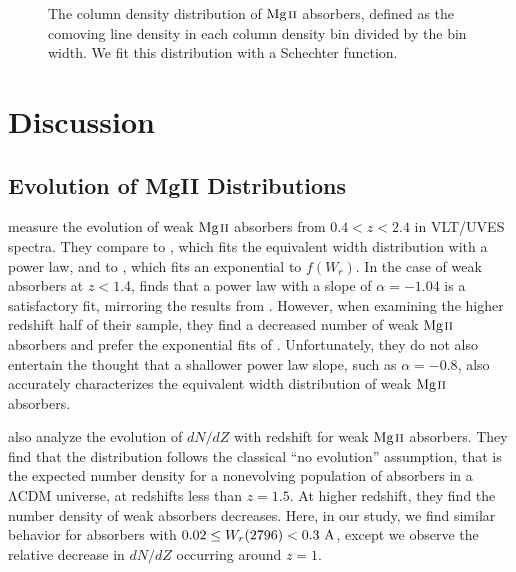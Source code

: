 \documentclass[iop,apj,numberedappendix,appendixfloats,twocolappendix]{emulateapj}
\begin{document}
\begin{figure*}[bth]
\caption{The column density distribution of ${\hbox{{\rm Mg}\kern 0.1em{\sc ii}}}$ absorbers, defined as the comoving line density in each column density bin divided by the bin width. We fit this distribution with a Schechter function.}
\label{fig:dndx_cuts}
\end{figure*}


\section{Discussion}
\label{sec:discussion}

\subsection{Evolution of MgII Distributions}

\cite{Narayanan2007} measure the evolution of weak ${\hbox{{\rm Mg}\kern 0.1em{\sc ii}}}$ absorbers from $0.4 < z < 2.4$ in VLT/UVES spectra. They compare to \cite{Churchill1999}, which fits the equivalent width distribution with a power law, and to \cite{Nestor2005}, which fits an exponential to $f(W_r)$. In the case of weak absorbers at $z < 1.4$, \cite{Narayanan2007} finds that a power law with a slope of $\alpha = -1.04$ is a satisfactory fit, mirroring the results from \cite{Churchill1999}. However, when examining the higher redshift half of their sample, they find a decreased number of weak ${\hbox{{\rm Mg}\kern 0.1em{\sc ii}}}$ absorbers and prefer the exponential fits of \cite{Nestor2005}. Unfortunately, they do not also entertain the thought that a shallower power law slope, such as $\alpha = -0.8$, also accurately characterizes the equivalent width distribution of weak ${\hbox{{\rm Mg}\kern 0.1em{\sc ii}}}$ absorbers. 

\cite{Narayanan2007} also analyze the evolution of $dN\!/dZ$ with redshift for weak ${\hbox{{\rm Mg}\kern 0.1em{\sc ii}}}$ absorbers. They find that the distribution follows the classical ``no evolution'' assumption, that is the expected number density for a nonevolving population of absorbers in a $\mathrm{\Lambda CDM}$ universe, at redshifts less than $z = 1.5$. At higher redshift, they find the number density of weak absorbers decreases. Here, in our study, we find similar behavior for absorbers with $0.02 \le W_r(2796) < 0.3~\mathrm{\AA}$, except we observe the relative decrease in $dN\!/dZ$ occurring around $z = 1$.
\end{document}
